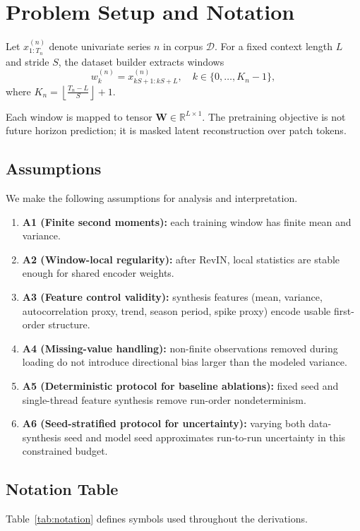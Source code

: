 \documentclass[journal]{IEEEtran}
\begin{document}
\section{Problem Setup and Notation}
Let $x^{(n)}_{1:T_n}$ denote univariate series $n$ in corpus $\mathcal{D}$. For a fixed context length $L$ and stride $S$, the dataset builder extracts windows
\begin{equation}
w^{(n)}_k = x^{(n)}_{kS+1:kS+L}, \quad k \in \{0,\ldots,K_n-1\},
\label{eq:window}
\end{equation}
where $K_n = \left\lfloor \frac{T_n-L}{S} \right\rfloor + 1$.

Each window is mapped to tensor $\mathbf{W} \in \mathbb{R}^{L \times 1}$. The pretraining objective is not future horizon prediction; it is masked latent reconstruction over patch tokens.

\subsection{Assumptions}
We make the following assumptions for analysis and interpretation.
\begin{enumerate}
    \item \textbf{A1 (Finite second moments):} each training window has finite mean and variance.
    \item \textbf{A2 (Window-local regularity):} after RevIN, local statistics are stable enough for shared encoder weights.
    \item \textbf{A3 (Feature control validity):} synthesis features (mean, variance, autocorrelation proxy, trend, season period, spike proxy) encode usable first-order structure.
    \item \textbf{A4 (Missing-value handling):} non-finite observations removed during loading do not introduce directional bias larger than the modeled variance.
    \item \textbf{A5 (Deterministic protocol for baseline ablations):} fixed seed and single-thread feature synthesis remove run-order nondeterminism.
    \item \textbf{A6 (Seed-stratified protocol for uncertainty):} varying both data-synthesis seed and model seed approximates run-to-run uncertainty in this constrained budget.
\end{enumerate}

\subsection{Notation Table}
Table~\ref{tab:notation} defines symbols used throughout the derivations.
\end{document}
